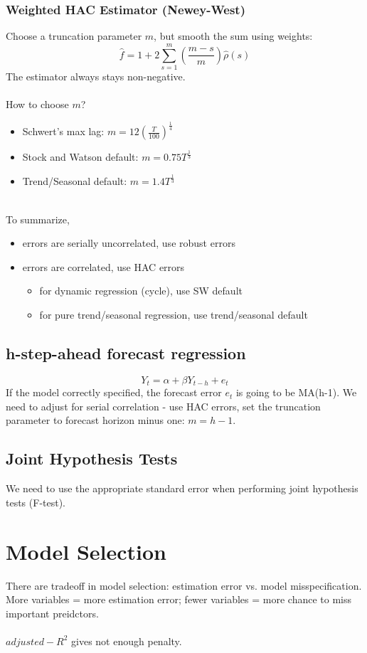 \documentclass{article}
\begin{document}
\subsubsection{Weighted HAC Estimator (Newey-West)}
Choose a truncation parameter $m$, but smooth the sum using weights:
$$\hat{f} = 1 + 2\sum_{s=1}^m \left(\frac{m-s}{m}\right) \hat{\rho} (s)$$
The estimator always stays non-negative.\\
\\
How to choose $m$?
\begin{itemize}
    \item Schwert's max lag: $m = 12(\frac{T}{100})^\frac{1}{4}$
    \item Stock and Watson default: $m = 0.75 T^\frac{1}{3}$
    \item Trend/Seasonal default: $m = 1.4T^\frac{1}{3}$
\end{itemize}
\\
To summarize, 
\begin{itemize}
    \item errors are serially uncorrelated, use robust errors
    \item errors are correlated, use HAC errors
    \begin{itemize}
        \item for dynamic regression (cycle), use SW default
        \item for pure trend/seasonal regression, use trend/seasonal default
    \end{itemize}
\end{itemize}

\subsection{h-step-ahead forecast regression}
$$Y_t = \alpha + \beta Y_{t-h} + e_t$$
If the model correctly specified, the forecast error $e_t$ is going to be MA(h-1). We need to adjust for serial correlation - use HAC errors, set the truncation parameter to forecast horizon minus one: $m=h-1$.

\subsection{Joint Hypothesis Tests}
We need to use the appropriate standard error when performing joint hypothesis tests (F-test).


\section{Model Selection}
There are tradeoff in model selection: estimation error vs. model misspecification. More variables = more estimation error; fewer variables = more chance to miss important preidctors.\\
\\
$adjusted-R^2$ gives not enough penalty.\\
\end{document}
